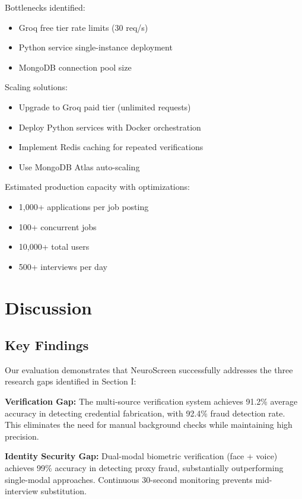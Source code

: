 \documentclass[conference]{IEEEtran}
\begin{document}
Bottlenecks identified:
\begin{itemize}
    \item Groq free tier rate limits (30 req/s)
    \item Python service single-instance deployment
    \item MongoDB connection pool size
\end{itemize}

Scaling solutions:
\begin{itemize}
    \item Upgrade to Groq paid tier (unlimited requests)
    \item Deploy Python services with Docker orchestration
    \item Implement Redis caching for repeated verifications
    \item Use MongoDB Atlas auto-scaling
\end{itemize}

Estimated production capacity with optimizations:
\begin{itemize}
    \item 1,000+ applications per job posting
    \item 100+ concurrent jobs
    \item 10,000+ total users
    \item 500+ interviews per day
\end{itemize}

\section{Discussion}

\subsection{Key Findings}

Our evaluation demonstrates that NeuroScreen successfully addresses the three research gaps identified in Section I:

\textbf{Verification Gap:} The multi-source verification system achieves 91.2\% average accuracy in detecting credential fabrication, with 92.4\% fraud detection rate. This eliminates the need for manual background checks while maintaining high precision.

\textbf{Identity Security Gap:} Dual-modal biometric verification (face + voice) achieves 99\% accuracy in detecting proxy fraud, substantially outperforming single-modal approaches. Continuous 30-second monitoring prevents mid-interview substitution.
\end{document}
